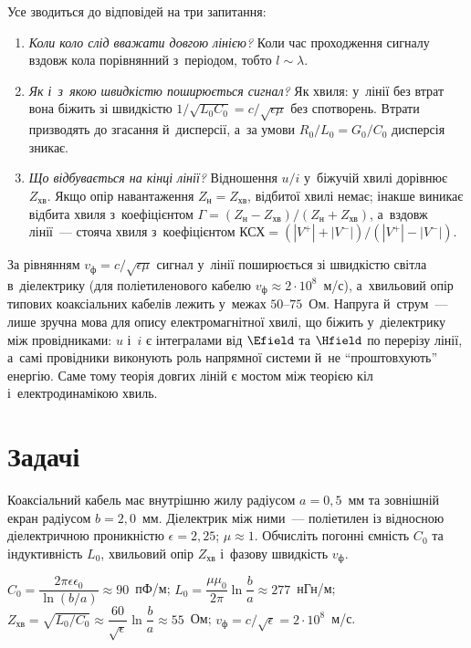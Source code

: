 Усе зводиться до відповідей на три запитання:
\begin{enumerate}
	\item \emph{Коли коло слід вважати довгою лінією?} Коли час проходження сигналу вздовж кола порівнянний з~періодом, тобто $l\sim\lambda$.
	\item \emph{Як і~з~якою швидкістю поширюється сигнал?} Як хвиля: у~лінії без втрат вона біжить зі швидкістю $1/\sqrt{L_0C_0}=c/\sqrt{\epsilon\mu}$ без спотворень. Втрати призводять до згасання й~дисперсії, а~за умови $R_0/L_0=G_0/C_0$ дисперсія зникає.
	\item \emph{Що відбувається на кінці лінії?} Відношення $u/i$ у~біжучій хвилі дорівнює $Z_{\text{хв}}$. Якщо опір навантаження $Z_{\text{н}}=Z_{\text{хв}}$, відбитої хвилі немає; інакше виникає відбита хвиля з~коефіцієнтом $\Gamma=(Z_{\text{н}}-Z_{\text{хв}})/(Z_{\text{н}}+Z_{\text{хв}})$, а~вздовж лінії~--- стояча хвиля з~коефіцієнтом $\text{КСХ}=(|V^+|+|V^-|)/(|V^+|-|V^-|)$.
\end{enumerate}

За рівнянням $v_{\text{ф}}=c/\sqrt{\epsilon\mu}$ сигнал у~лінії поширюється зі швидкістю світла в~діелектрику (для поліетиленового кабелю $v_{\text{ф}}\approx2\cdot10^{8}$~м/с), а~хвильовий опір типових коаксіальних кабелів лежить у~межах $50$--$75$~Ом. Напруга й~струм~--- лише зручна мова для опису електромагнітної хвилі, що біжить у~діелектрику між провідниками: $u$ і~$i$ є інтегралами від $\Efield$ та $\Hfield$ по перерізу лінії, а~самі провідники виконують роль напрямної системи й~не \enquote{проштовхують} енергію. Саме тому теорія довгих ліній є мостом між теорією кіл і~електродинамікою хвиль.

\section*{Задачі}
{}


\begin{problem}\label{prb:CoaxParameters}
	Коаксіальний кабель має внутрішню жилу радіусом $a = 0{,}5$~мм та зовнішній екран радіусом $b = 2{,}0$~мм. Діелектрик між
	ними~--- поліетилен із відносною діелектричною проникністю $\epsilon = 2{,}25$; $\mu \approx 1$. Обчисліть погонні ємність
	$C_0$ та індуктивність $L_0$, хвильовий опір $Z_{\text{хв}}$ і~фазову швидкість $v_{\text{ф}}$.
	\begin{solution}
		$C_0 = \dfrac{2\pi\epsilon\epsilon_0}{\ln(b/a)} \approx 90$~пФ/м; $L_0 = \dfrac{\mu\mu_0}{2\pi}\ln\dfrac ba \approx 277$~нГн/м; $Z_{\text{хв}} = \sqrt{L_0/C_0} \approx \dfrac{60}{\sqrt\epsilon}\ln\dfrac ba \approx 55$~Ом; $v_{\text{ф}} = c/\sqrt\epsilon = 2\cdot10^{8}$~м/с.
	\end{solution}
\end{problem}

